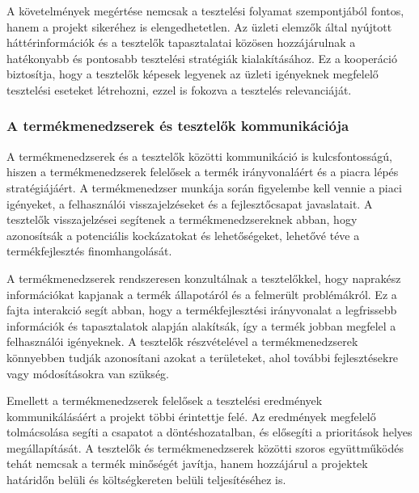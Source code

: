 A követelmények megértése nemcsak a tesztelési folyamat szempontjából fontos, hanem a projekt sikeréhez is elengedhetetlen. Az üzleti elemzők által nyújtott háttérinformációk és a tesztelők tapasztalatai közösen hozzájárulnak a hatékonyabb és pontosabb tesztelési stratégiák kialakításához. Ez a kooperáció biztosítja, hogy a tesztelők képesek legyenek az üzleti igényeknek megfelelő tesztelési eseteket létrehozni, ezzel is fokozva a tesztelés relevanciáját.

\subsubsection{A termékmenedzserek és tesztelők kommunikációja}
A termékmenedzserek és a tesztelők közötti kommunikáció is kulcsfontosságú, hiszen a termékmenedzserek felelősek a termék irányvonaláért és a piacra lépés stratégiájáért. A termékmenedzser munkája során figyelembe kell vennie a piaci igényeket, a felhasználói visszajelzéseket és a fejlesztőcsapat javaslatait. A tesztelők visszajelzései segítenek a termékmenedzsereknek abban, hogy azonosítsák a potenciális kockázatokat és lehetőségeket, lehetővé téve a termékfejlesztés finomhangolását.

A termékmenedzserek rendszeresen konzultálnak a tesztelőkkel, hogy naprakész információkat kapjanak a termék állapotáról és a felmerült problémákról. Ez a fajta interakció segít abban, hogy a termékfejlesztési irányvonalat a legfrissebb információk és tapasztalatok alapján alakítsák, így a termék jobban megfelel a felhasználói igényeknek. A tesztelők részvételével a termékmenedzserek könnyebben tudják azonosítani azokat a területeket, ahol további fejlesztésekre vagy módosításokra van szükség.

Emellett a termékmenedzserek felelősek a tesztelési eredmények kommunikálásáért a projekt többi érintettje felé. Az eredmények megfelelő tolmácsolása segíti a csapatot a döntéshozatalban, és elősegíti a prioritások helyes megállapítását. A tesztelők és termékmenedzserek közötti szoros együttműködés tehát nemcsak a termék minőségét javítja, hanem hozzájárul a projektek határidőn belüli és költségkereten belüli teljesítéséhez is.